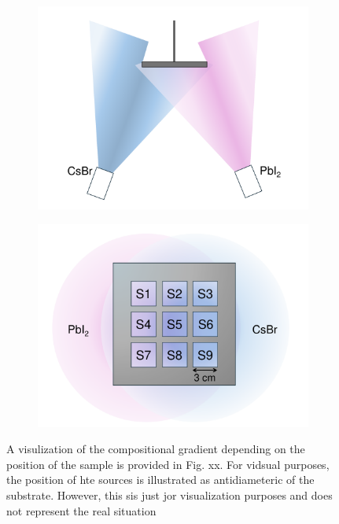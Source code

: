 \begin{figure}[htbp]
    \centering
    \begin{subfigure}[t]{0.49\textwidth} %
        \centering
        \includegraphics[width=\textwidth]{chapters/stability/imeges/Chamber - Side View.pdf} %
        \caption{}
        \label{}
    \end{subfigure}
    \begin{subfigure}[t]{0.49\textwidth} %
        \centering
        \includegraphics[width=\textwidth]{chapters/stability/imeges/Holder - Gradient - Schematic.pdf} %
        \caption{}        
        \label{}
    \end{subfigure}

    \caption{A visulization of the compositional gradient depending on the position of the sample is provided in Fig. xx. For vidsual purposes, the position of hte sources is illustrated as antidiameteric of the substrate. However, this sis just jor visualization purposes and does not represent the real situation}   
    \label{fig:stability:combinatorial_approach}
\end{figure}


